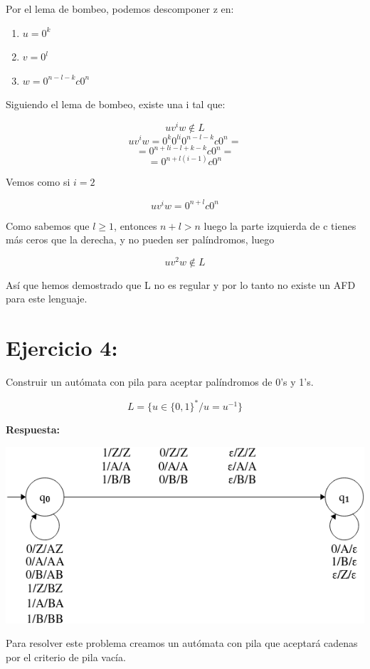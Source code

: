 \documentclass[12pt, spanish]{article}
\begin{document}
Por el lema de bombeo, podemos descomponer z en:

\begin{enumerate}
	\item $u = 0^k$
	\item $v = 0^l$
	\item $w =0^{n-l-k}c0^n$
\end{enumerate}

Siguiendo el lema de bombeo, existe una i tal que:

$$ uv^iw \not \in L $$
$$uv^iw = 0^k0^{li}0^{n-l-k}c0^n = $$
$$ = 0^{n + li - l + k - k}c0^n  = $$
$$ = 0^{n + l(i - 1)}c0^n  $$

Vemos como si $i = 2$

$$ uv^iw = 0^{n+l}c0^n $$

Como sabemos que $l \geq 1$, entonces $ n + l > n $ luego la parte izquierda de c tienes más ceros que la derecha, y no pueden ser palíndromos, luego 

$$ uv^2w \not \in L $$

Así que hemos demostrado que L no es regular y por lo tanto no existe un AFD para este lenguaje.


\newpage


\section{Ejercicio 4:}

Construir un autómata con pila para aceptar palíndromos de 0's y 1's.

$$ L = \{ u \in \{0, 1\}^* / u = u^{-1} \} $$

\textbf{Respuesta:}

\begin{center}
	\includegraphics[scale=0.5]{aut_pila.png}
\end{center}

Para resolver este problema creamos un autómata con pila que aceptará cadenas por el criterio de pila vacía.
\end{document}
